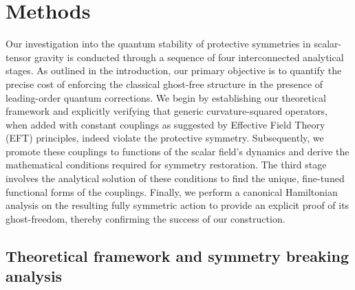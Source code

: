 \documentclass[twocolumn]{aastex631}
\begin{document}
\section{Methods}
\label{sec:methods}
Our investigation into the quantum stability of protective symmetries in scalar-tensor gravity is conducted through a sequence of four interconnected analytical stages. As outlined in the introduction, our primary objective is to quantify the precise cost of enforcing the classical ghost-free structure in the presence of leading-order quantum corrections. We begin by establishing our theoretical framework and explicitly verifying that generic curvature-squared operators, when added with constant couplings as suggested by Effective Field Theory (EFT) principles, indeed violate the protective symmetry. Subsequently, we promote these couplings to functions of the scalar field's dynamics and derive the mathematical conditions required for symmetry restoration. The third stage involves the analytical solution of these conditions to find the unique, fine-tuned functional forms of the couplings. Finally, we perform a canonical Hamiltonian analysis on the resulting fully symmetric action to provide an explicit proof of its ghost-freedom, thereby confirming the success of our construction.

\subsection{Theoretical framework and symmetry breaking analysis}
\end{document}
